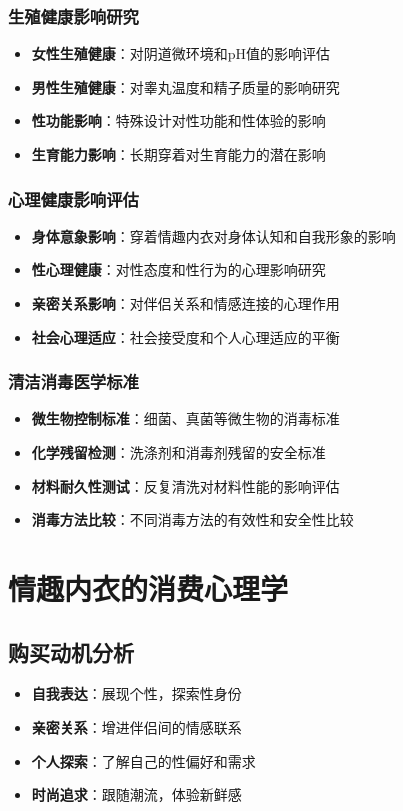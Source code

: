 \documentclass[12pt,UTF8]{ctexbook}
\begin{document}
\subsubsection{生殖健康影响研究}
\begin{itemize}[leftmargin=2cm]
	\item \textbf{女性生殖健康}：对阴道微环境和pH值的影响评估
	\item \textbf{男性生殖健康}：对睾丸温度和精子质量的影响研究
	\item \textbf{性功能影响}：特殊设计对性功能和性体验的影响
	\item \textbf{生育能力影响}：长期穿着对生育能力的潜在影响
\end{itemize}

\subsubsection{心理健康影响评估}
\begin{itemize}[leftmargin=2cm]
	\item \textbf{身体意象影响}：穿着情趣内衣对身体认知和自我形象的影响
	\item \textbf{性心理健康}：对性态度和性行为的心理影响研究
	\item \textbf{亲密关系影响}：对伴侣关系和情感连接的心理作用
	\item \textbf{社会心理适应}：社会接受度和个人心理适应的平衡
\end{itemize}

\subsubsection{清洁消毒医学标准}
\begin{itemize}[leftmargin=2cm]
	\item \textbf{微生物控制标准}：细菌、真菌等微生物的消毒标准
	\item \textbf{化学残留检测}：洗涤剂和消毒剂残留的安全标准
	\item \textbf{材料耐久性测试}：反复清洗对材料性能的影响评估
	\item \textbf{消毒方法比较}：不同消毒方法的有效性和安全性比较
\end{itemize}

\section{情趣内衣的消费心理学}
\subsection{购买动机分析}
\begin{itemize}[leftmargin=2cm]
	\item \textbf{自我表达}：展现个性，探索性身份
	\item \textbf{亲密关系}：增进伴侣间的情感联系
	\item \textbf{个人探索}：了解自己的性偏好和需求
	\item \textbf{时尚追求}：跟随潮流，体验新鲜感
\end{itemize}
\end{document}
